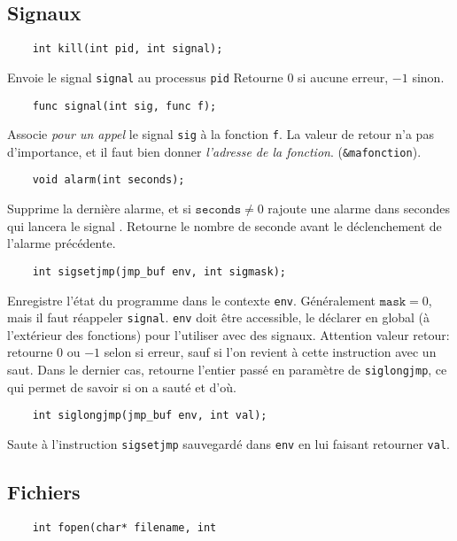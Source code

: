 \documentclass[9pt,twocolumn,a4paper]{article}
\begin{document}
\subsection{Signaux}

\begin{lstlisting}
    int kill(int pid, int signal);
\end{lstlisting}
Envoie le signal \texttt{signal} au processus \texttt{pid}
Retourne $0$ si aucune erreur, $-1$ sinon.

\begin{lstlisting}
    func signal(int sig, func f);
\end{lstlisting}
Associe \emph{pour un appel} le signal \texttt{sig} à la fonction \texttt{f}.
La valeur de retour n'a pas d'importance, et il faut bien donner \emph{l'adresse de la fonction}.
(\texttt{\&mafonction}).

\begin{lstlisting}
    void alarm(int seconds);
\end{lstlisting}
Supprime la dernière alarme, et si $\texttt{seconds} \neq 0$ rajoute une alarme dans  secondes qui lancera le signal .
Retourne le nombre de seconde avant le déclenchement de l'alarme précédente.

\begin{lstlisting}
    int sigsetjmp(jmp_buf env, int sigmask);
\end{lstlisting}
Enregistre l'état du programme dans le contexte \texttt{env}. Généralement $\texttt{mask} = 0$, mais il faut réappeler \texttt{signal}.
\texttt{env} doit être accessible, le déclarer en global (à l'extérieur des fonctions) pour l'utiliser avec des signaux.
Attention valeur retour: retourne $0$ ou $-1$ selon si erreur, sauf si l'on revient à cette instruction avec un saut.
Dans le dernier cas, retourne l'entier passé en paramètre de \texttt{siglongjmp}, ce qui permet de savoir si on a sauté et d'où.

\begin{lstlisting}
    int siglongjmp(jmp_buf env, int val);
\end{lstlisting}
Saute à l'instruction \texttt{sigsetjmp} sauvegardé dans \texttt{env} en lui faisant retourner \texttt{val}.

\subsection{Fichiers}

\begin{lstlisting}
    int fopen(char* filename, int 
\end{lstlisting}
\end{document}
